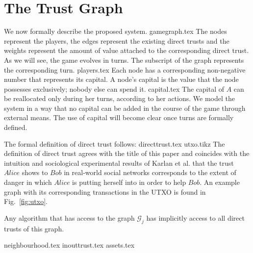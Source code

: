\section{The Trust Graph}
  We now formally describe the proposed system.
  {gamegraph.tex}
  \noindent The nodes represent the players, the edges represent the existing direct trusts and the weights represent the
  amount of value attached to the corresponding direct trust. As we will see, the game evolves in turns. The subscript of the
  graph represents the corresponding turn.
  {players.tex}
  \noindent Each node has a corresponding non-negative number that represents its capital. A node's capital is the value that
  the node possesses exclusively; nobody else can spend it.
  {capital.tex}
  \noindent The capital of $A$ can be reallocated only during her turns, according to her actions. We model the system in a
  way that no capital can be added in the course of the game through external means. The use of capital will become clear once
  turns are formally defined.

  The formal definition of direct trust follows:
  {directtrust.tex}
  {utxo.tikz}
  \noindent The definition of direct trust agrees with the title of this paper and coincides with the intuition and
  sociological experimental results of Karlan et al. \cite{kmrs} that the trust $Alice$ shows to $Bob$ in real-world social
  networks corresponds to the extent of danger in which $Alice$ is putting herself into in order to help $Bob$. An example
  graph with its corresponding transactions in the UTXO is found in Fig.~\ref{fig:utxo}.


  Any algorithm that has access to the graph $\mathcal{G}_j$ has implicitly access to all direct trusts of this graph.

  {neighbourhood.tex}
  {inouttrust.tex}
  {assets.tex}
